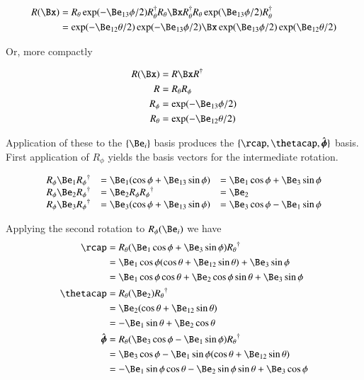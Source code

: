 \documentclass{article}
\newcommand{\phicap}[0]{\hat{\boldsymbol{\phi}}}
\begin{document}
\begin{align*}
R(\Bx) 
&= R_\theta \exp( - \Be_{13} \phi/2 ) R_\theta^\dagger R_\theta \Bx R_\theta^\dagger R_\theta \exp( \Be_{13} \phi/2 ) R_\theta^\dagger \\
&= \exp( - \Be_{12} \theta/2 ) \exp( - \Be_{13} \phi/2 ) \Bx \exp( \Be_{13} \phi/2 ) \exp( \Be_{12} \theta/2 ) \\
\end{align*}

Or, more compactly

\begin{align}
R(\Bx) &= R \Bx R^\dagger \\
R &= R_\theta R_\phi \\
R_\phi &= \exp(-\Be_{13}\phi/2) \\
R_\theta &= \exp(-\Be_{12}\theta/2)
\end{align}

Application of these to the $\{\Be_i\}$ basis produces the $\{\rcap, \thetacap, \phicap\}$ basis.  First application 
of $R_\phi$ yields the basis vectors for the intermediate rotation.

\begin{align*}
\begin{array}{l l l}
{R_\phi}\Be_1 {R_\phi}^\dagger &= \Be_1 (\cos\phi + \Be_{13} \sin\phi) &= \Be_1 \cos\phi + \Be_3 \sin\phi \\
{R_\phi}\Be_2 {R_\phi}^\dagger &= \Be_2 R_\phi {R_\phi}^\dagger &= \Be_2 \\
{R_\phi}\Be_3 {R_\phi}^\dagger &= \Be_3 (\cos\phi + \Be_{13} \sin\phi) &= \Be_3 \cos\phi - \Be_1 \sin\phi \\
\end{array}
\end{align*}

Applying the second rotation to $R_\phi(\Be_i)$ we have
\begin{align*}
\rcap 
&= {R_\theta}( \Be_1 \cos\phi + \Be_3 \sin\phi ) {R_\theta}^\dagger \\
&=
\Be_1 \cos\phi (\cos\theta + \Be_{12} \sin\theta)
+ \Be_3 \sin\phi \\
&=
\Be_1 \cos\phi \cos\theta 
+ \Be_2 \cos\phi \sin\theta
+ \Be_3 \sin\phi \\
\thetacap
&= {R_\theta} ( \Be_2 ) {R_\theta}^\dagger \\
&= \Be_2 (\cos\theta + \Be_{12} \sin\theta) \\
&= - \Be_1 \sin\theta + \Be_2 \cos\theta \\
\phicap
&= {R_\theta} ( \Be_3 \cos\phi - \Be_1 \sin\phi ) {R_\theta}^\dagger \\
&= \Be_3 \cos\phi - \Be_1 \sin\phi (\cos\theta + \Be_{12} \sin\theta) \\
&= 
- \Be_1 \sin\phi \cos\theta 
- \Be_2 \sin\phi \sin\theta 
+ \Be_3 \cos\phi
\\
\end{align*}
\end{document}

